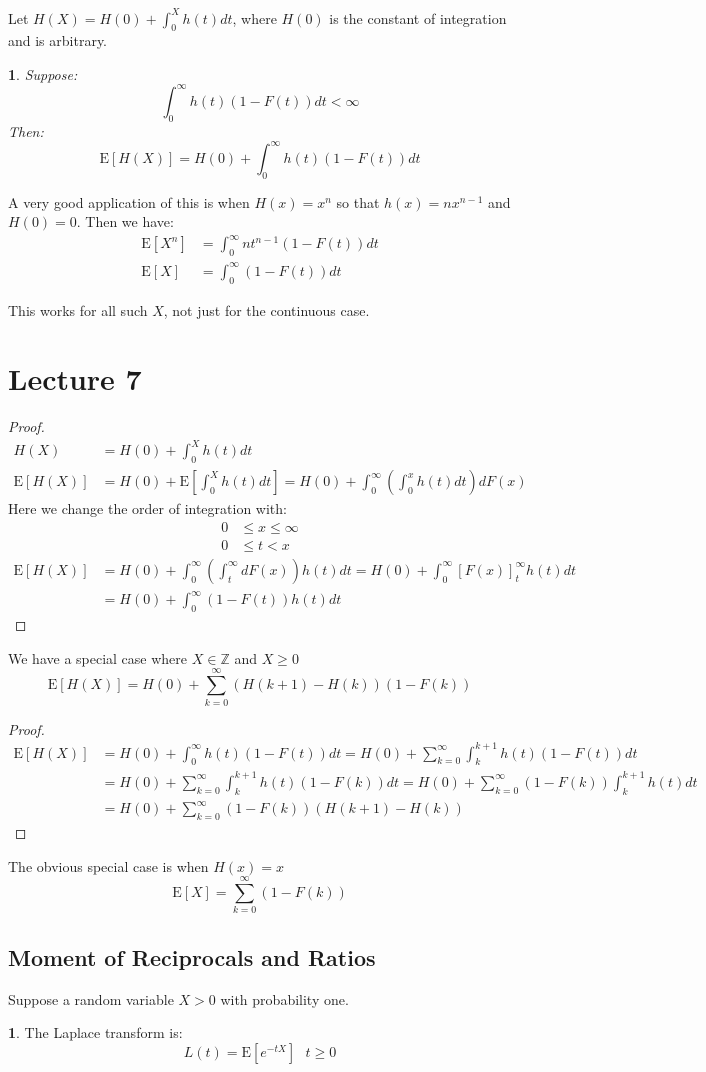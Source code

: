 \documentclass[english,12pt]{article}
\theoremstyle{plain}
\newtheorem*{proposition}{\protect\propositionname}
\theoremstyle{definition}
\newtheorem*{definition}{\protect\definitionname}
\theoremstyle{definition} %
\newcommand{\prop}[1]{\begin{proposition} #1 \end{proposition} }
\newcommand{\defn}[1]{\begin{definition} #1 \end{definition} }
\newcommand{\prf}[1]{\begin{proof} #1 \end{proof} }
\providecommand{\definitionname}{Definition}
\providecommand{\propositionname}{Proposition}
\newcommand{\brac}[1]{\left(#1\right)} %
\newcommand{\sqbrac}[1]{\left[#1\right]} %
\newcommand{\Z}{\mathbb{Z}} %
\newcommand{\ex}[1]{\mbox{E} \left[ #1 \right]}
\begin{document}
Let $H(X)=H(0)+\int_0^Xh(t)dt$, where $H(0)$ is the constant of integration and is arbitrary.

\prop{
Suppose:
\[\int_0^\infty h(t)(1-F(t))dt<\infty\]
Then:
\[\ex{H(X)}=H(0)+\int_0^\infty h(t)(1-F(t))dt\]
}

A very good application of this is when $H(x)=x^n$ so that $h(x)=nx^{n-1}$ and $H(0)=0$.  Then we have:
\begin{align*}
\ex{X^n}&=\int_0^\infty nt^{n-1}(1-F(t))dt\\
\ex{X}&=\int_0^\infty(1-F(t))dt
\end{align*}

This works for all such $X$, not just for the continuous case.

\section*{Lecture 7}
\prf{
\begin{align*}
H(X)&=H(0)+\int_0^Xh(t)dt\\
\ex{H(X)}&=H(0)+\ex{\int_0^Xh(t)dt}
=H(0)+\int_0^\infty\brac{\int_0^xh(t)dt}dF(x)
\end{align*}
Here we change the order of integration with:
\begin{align*}
0&\le x\le\infty\\
0&\le t<x
\end{align*}
\begin{align*}
\ex{H(X)}&=H(0)+\int_0^\infty\brac{\int_t^\infty dF(x)}h(t)dt
=H(0)+\int_0^\infty\sqbrac{F(x)}_t^\infty h(t)dt\\
&=H(0)+\int_0^\infty(1-F(t))h(t)dt
\end{align*}
}

We have a special case where $X\in\Z$ and $X\ge 0$
\[\ex{H(X)}=H(0)+\sum\limits_{k=0}^\infty(H(k+1)-H(k))(1-F(k))\]
\prf{
\begin{align*}
\ex{H(X)}&=H(0)+\int_0^\infty h(t)(1-F(t))dt
=H(0)+\sum\limits_{k=0}^\infty\int_k^{k+1}h(t)(1-F(t))dt\\
&=H(0)+\sum\limits_{k=0}^\infty\int_k^{k+1}h(t)(1-F(k))dt
=H(0)+\sum\limits_{k=0}^\infty(1-F(k))\int_k^{k+1}h(t)dt\\
&=H(0)+\sum\limits_{k=0}^\infty (1-F(k))(H(k+1)-H(k))
\end{align*}
}

The obvious special case is when $H(x)=x$
\[\ex{X}=\sum\limits_{k=0}^\infty(1-F(k))\]

\subsection{Moment of Reciprocals and Ratios}
Suppose a random variable $X>0$ with probability one.
\defn{
The Laplace transform is:
\[L(t)=\ex{e^{-tX}}\text{ }t\ge 0\]
}
\end{document}

